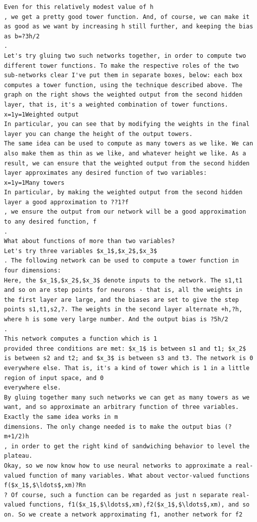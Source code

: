 \begin{lstlisting}
Even for this relatively modest value of h
, we get a pretty good tower function. And, of course, we can make it as good as we want by increasing h still further, and keeping the bias as b=?3h/2
.
Let's try gluing two such networks together, in order to compute two different tower functions. To make the respective roles of the two sub-networks clear I've put them in separate boxes, below: each box computes a tower function, using the technique described above. The graph on the right shows the weighted output from the second hidden layer, that is, it's a weighted combination of tower functions.
x=1y=1Weighted output
In particular, you can see that by modifying the weights in the final layer you can change the height of the output towers.
The same idea can be used to compute as many towers as we like. We can also make them as thin as we like, and whatever height we like. As a result, we can ensure that the weighted output from the second hidden layer approximates any desired function of two variables:
x=1y=1Many towers 
In particular, by making the weighted output from the second hidden layer a good approximation to ??1?f
, we ensure the output from our network will be a good approximation to any desired function, f
.
What about functions of more than two variables?
Let's try three variables $x_1$,$x_2$,$x_3$
. The following network can be used to compute a tower function in four dimensions:
Here, the $x_1$,$x_2$,$x_3$ denote inputs to the network. The s1,t1 and so on are step points for neurons - that is, all the weights in the first layer are large, and the biases are set to give the step points s1,t1,s2,?. The weights in the second layer alternate +h,?h, where h is some very large number. And the output bias is ?5h/2
.
This network computes a function which is 1
provided three conditions are met: $x_1$ is between s1 and t1; $x_2$ is between s2 and t2; and $x_3$ is between s3 and t3. The network is 0 everywhere else. That is, it's a kind of tower which is 1 in a little region of input space, and 0
everywhere else.
By gluing together many such networks we can get as many towers as we want, and so approximate an arbitrary function of three variables. Exactly the same idea works in m
dimensions. The only change needed is to make the output bias (?m+1/2)h
, in order to get the right kind of sandwiching behavior to level the plateau.
Okay, so we now know how to use neural networks to approximate a real-valued function of many variables. What about vector-valued functions f($x_1$,$\ldots$,xm)?Rn
? Of course, such a function can be regarded as just n separate real-valued functions, f1($x_1$,$\ldots$,xm),f2($x_1$,$\ldots$,xm), and so on. So we create a network approximating f1, another network for f2

\end{lstlisting}
